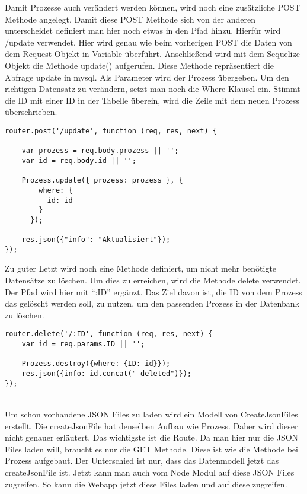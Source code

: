 \documentclass[a4paper,11pt]{scrreprt}
\begin{document}
Damit Prozesse auch verändert werden können, wird noch eine zusätzliche POST Methode angelegt. Damit diese POST Methode sich von der anderen unterscheidet definiert man hier noch etwas in den Pfad hinzu. Hierfür wird /update verwendet. Hier wird genau wie beim vorherigen POST die Daten von dem Request Objekt in Variable überführt. Anschließend wird mit dem Sequelize Objekt die Methode update() aufgerufen. Diese Methode repräsentiert die Abfrage update in mysql. Als Parameter wird der Prozess übergeben. Um den richtigen Datensatz zu verändern, setzt man noch die Where Klausel ein. Stimmt die ID mit einer ID in der Tabelle überein, wird die Zeile mit dem neuen Prozess überschrieben. 
 \begin{lstlisting}
router.post('/update', function (req, res, next) {

    var prozess = req.body.prozess || '';
    var id = req.body.id || '';

    Prozess.update({ prozess: prozess }, {
        where: {
          id: id
        }
      });
    
    res.json({"info": "Aktualisiert"});
});
\end{lstlisting}

Zu guter Letzt wird noch eine Methode definiert, um nicht mehr benötigte Datensätze zu löschen. Um dies zu erreichen, wird die Methode delete verwendet. Der Pfad wird hier mit “:ID” ergänzt. Das Ziel davon ist, die ID von dem Prozess das gelöscht werden soll, zu nutzen, um den passenden Prozess in der Datenbank zu löschen.
 \begin{lstlisting}
router.delete('/:ID', function (req, res, next) {
    var id = req.params.ID || '';

    Prozess.destroy({where: {ID: id}});
    res.json({info: id.concat(" deleted")});
});
\end{lstlisting}
\\
Um schon vorhandene JSON Files zu laden wird ein Modell von CreateJsonFiles erstellt. Die createJsonFile hat denselben Aufbau wie Prozess. Daher wird dieser nicht genauer erläutert. Das wichtigste ist die Route. Da man hier nur die JSON Files laden will, braucht es nur die GET Methode. Diese ist wie die Methode bei Prozess aufgebaut. Der Unterschied ist nur, dass das Datenmodell jetzt das createJsonFile ist. 
Jetzt kann man auch vom Node Modul auf diese JSON Files zugreifen.
So kann die Webapp jetzt diese Files laden und auf diese zugreifen.
\end{document}
